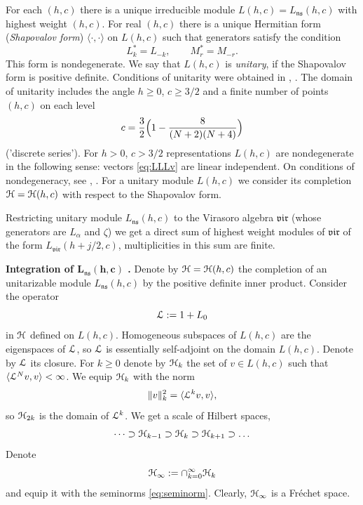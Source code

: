 \documentclass[]{amsart}
\newcounter{sec}
\newcounter{punct}[sec]
\def\punct{\refstepcounter{punct}{\arabic{sec}.\arabic{punct}.  }}
\def\ge{\geqslant}
\def\la{\langle}
\def\ra{\rangle}
\def\cH{\EuScript H}
\def\cL{\EuScript L}
\def\sm{\smallskip}
\def\ns{\mathfrak{ns}}
\def\vir{\mathfrak{vir}}
\begin{document}
For each $(h,c)$ there is a unique irreducible module
 $L(h,c)=L_\ns(h,c)$ with highest weight $(h,c)$.
For  real $(h,c)$ there is a unique Hermitian form ({\it Shapovalov form}) $\la\cdot,\cdot\ra$ on $L(h,c)$ such that 
generators  satisfy the condition 
$$
L_k^*=L_{-k}, \qquad M^*_r=M_{-r}.
$$
This form is nondegenerate. We say that
 $L(h,c)$ is {\it unitary}, if the Shapovalov form is 
positive definite. Conditions of unitarity were obtained in
\cite{Fri}, \cite{GOK}. The domain of unitarity includes the angle
$h\ge 0$, $c\ge 3/2$ and a finite number of points $(h,c)$
on each level
 $$c=\frac 32\Bigl(1-\frac{8}{(N+2)(N+4)}\Bigr)$$
  ('discrete series'). For $h>0$, $c>3/2$ representations
$L(h,c)$ are nondegenerate in the following sense: vectors \eqref{eq:LLLv} are linear independent. On conditions
of nondegeneracy, see \cite{KW}, \cite{MR-C}.
For a unitary module $L(h,c)$ we consider its completion $\cH=\cH(h,c)$ with respect to the Shapovalov
form.



\sm

Restricting unitary module $L_\ns(h,c)$ to the Virasoro  algebra $\vir$ (whose generators are $L_\alpha$ and $\zeta$) we get a direct
sum of highest weight modules of $\vir$
of the form $L_\vir(h+j/2,c)$, multiplicities in this sum are finite.



 

\sm

{\bf \punct Integration of $\boldsymbol{L_\ns(h,c)}$%
\label{ss:integration}.}
Denote by $\cH=\cH(h,c)$ the completion of an unitarizable  module
$L_\ns(h,c)$ by the positive definite inner product.
Consider the  operator 
$$\cL:=1+L_0$$
 in 
$\cH$ defined on $L(h,c)$. Homogeneous subspaces of $L(h,c)$ are the eigenspaces of $\cL$, so
$\cL$ is essentially self-adjoint on the domain $L(h,c)$. Denote by $\cL$ its closure.
For $k\ge 0$ denote by $\cH_k$ the
set of $v\in L(h,c)$ such that
$\la \cL^N v,v\ra<\infty$.
We equip $\cH_k$ with the norm
\begin{equation}
 \| v\|^2_k=\la \cL^k v,v\ra,
 \label{eq:seminorm}
\end{equation}
so $\cH_{2k}$ is the domain of $\cL^k$.
We get a scale of Hilbert spaces,
\begin{equation}
\dots \supset \cH_{k-1}\supset  \cH_{k} \supset \cH_{k+1}\supset\dots 
\label{eq:cH-k} 
\end{equation}
 Denote
\begin{equation}
\cH_\infty:=\cap_{k=0}^\infty \cH_k
\label{ss:cH-infty}
\end{equation}
and equip it with the seminorms \eqref{eq:seminorm}.
Clearly, $\cH_\infty$ is a Fr\'echet space.
\end{document}
